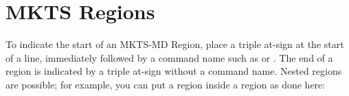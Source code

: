 \begin{multicols}{2}\mktsShowpar\par
{}\end{multicols}
\section{MKTS Regions 
}
\begin{multicols}{2}To indicate the start of an MKTS-MD Region, place a triple at-sign 
at the start of a line, immediately followed by a command name such as
 or . The end of a region is indicated by a
triple at-sign without a command name. Nested regions are possible; for example,
you can put a  region inside a  region as
done here:\mktsShowpar\par
{}\end{multicols}
